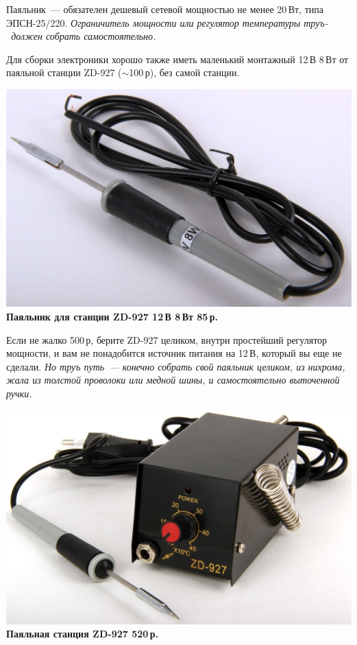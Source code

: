 \documentclass{magazine}
\begin{document}
{Паяльник\ --- обязателен дешевый сетевой мощностью не менее 20\,Вт, типа
ЭПСН-25/220.
\emph{Ограничитель мощности или регулятор температуры труъ-\scr\ должен собрать
самостоятельно.}

Для сборки электроники хорошо также иметь маленький монтажный 12\,В 8\,Вт от
паяльной станции ZD-927 ($\sim$100\,р), без самой станции. 

\noindent\href{http://voltmaster-samara.ru/catalog/product/00047380/}{
\includegraphics[width=\columnwidth]{fig/00/Iron8W.jpg}}
\textbf{Паяльник для станции ZD-927 12\,В 8\,Вт 85\,р.}


Если не жалко 500\,р, берите ZD-927 целиком, внутри простейший регулятор
мощности, и вам не понадобится источник питания на 12\,В, который вы еще не
сделали. \emph{Но труъ путь\ --- конечно собрать свой паяльник целиком, из
нихрома, жала из толстой проволоки или медной шины, и самостоятельно выточенной
ручки.}

\noindent\href{http://voltmaster-samara.ru/catalog/product/00073790/}{
\includegraphics[width=\columnwidth]{fig/00/ZD927.jpg}}
\textbf{Паяльная станция ZD-927 520\,р.}

}
\end{document}
